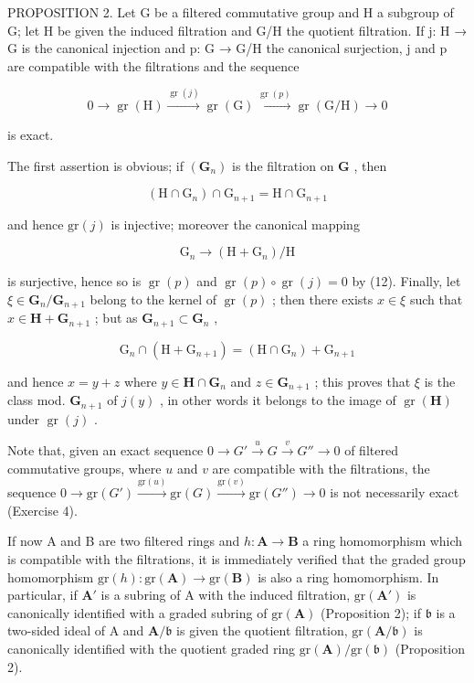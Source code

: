 PROPOSITION 2. Let G be a filtered commutative group and H a subgroup of G; let H be given the induced filtration and G/H the quotient filtration. If j: H → G is the canonical injection and p: G → G/H the canonical surjection, j and p are compatible with the filtrations and the sequence

\[
0 \longrightarrow \operatorname{gr} (\mathrm{H}) \xrightarrow {\operatorname{gr} (j)} \operatorname{gr} (\mathrm{G}) \xrightarrow {\operatorname{gr} (p)} \operatorname{gr} (\mathrm{G} / \mathrm{H}) \longrightarrow 0\tag{13}
\]

is exact.

The first assertion is obvious; if \((\mathbf{G}_n)\) is the filtration on \(\mathbf{G}\) , then

\[
\left(\mathrm{H} \cap \mathrm{G} _ {n}\right) \cap \mathrm{G} _ {n + 1} = \mathrm{H} \cap \mathrm{G} _ {n + 1}
\]

and hence \(\mathrm{gr}(j)\) is injective; moreover the canonical mapping

\[
\mathrm{G} _ {n} \rightarrow (\mathrm{H} + \mathrm{G} _ {n}) / \mathrm{H}
\]

is surjective, hence so is \(\operatorname{gr}(p)\) and \(\operatorname{gr}(p) \circ \operatorname{gr}(j) = 0\) by (12). Finally, let \(\xi \in \mathbf{G}_n / \mathbf{G}_{n+1}\) belong to the kernel of \(\operatorname{gr}(p)\) ; then there exists \(x \in \xi\) such that \(x \in \mathbf{H} + \mathbf{G}_{n+1}\) ; but as \(\mathbf{G}_{n+1} \subset \mathbf{G}_n\) ,

\[
\mathrm{G} _ {n} \cap (\mathrm{H} + \mathrm{G} _ {n + 1}) = (\mathrm{H} \cap \mathrm{G} _ {n}) + \mathrm{G} _ {n + 1}
\]

and hence \(x = y + z\) where \(y \in \mathbf{H} \cap \mathbf{G}_n\) and \(z \in \mathbf{G}_{n+1}\) ; this proves that \(\xi\) is the class mod. \(\mathbf{G}_{n+1}\) of \(j(y)\) , in other words it belongs to the image of \(\operatorname{gr}(\mathbf{H})\) under \(\operatorname{gr}(j)\) .

Note that, given an exact sequence \(0 \to G' \xrightarrow{u} G \xrightarrow{v} G'' \to 0\) of filtered commutative groups, where \(u\) and \(v\) are compatible with the filtrations, the sequence \(0 \longrightarrow \text{gr}(G') \xrightarrow{\text{gr}(u)} \text{gr}(G) \xrightarrow{\text{gr}(v)} \text{gr}(G'') \longrightarrow 0\) is not necessarily exact (Exercise 4).

If now A and B are two filtered rings and \(h \colon \mathbf{A} \to \mathbf{B}\) a ring homomorphism which is compatible with the filtrations, it is immediately verified that the graded group homomorphism \(\mathrm{gr}(h) \colon \mathrm{gr}(\mathbf{A}) \to \mathrm{gr}(\mathbf{B})\) is also a ring homomorphism. In particular, if \(\mathbf{A}'\) is a subring of A with the induced filtration, \(\mathrm{gr}(\mathbf{A}')\) is canonically identified with a graded subring of \(\mathrm{gr}(\mathbf{A})\) (Proposition 2); if \(\mathfrak{b}\) is a two-sided ideal of A and \(\mathbf{A} / \mathfrak{b}\) is given the quotient filtration, \(\mathrm{gr}(\mathbf{A} / \mathfrak{b})\) is canonically identified with the quotient graded ring \(\mathrm{gr}(\mathbf{A}) / \mathrm{gr}(\mathfrak{b})\) (Proposition 2).

